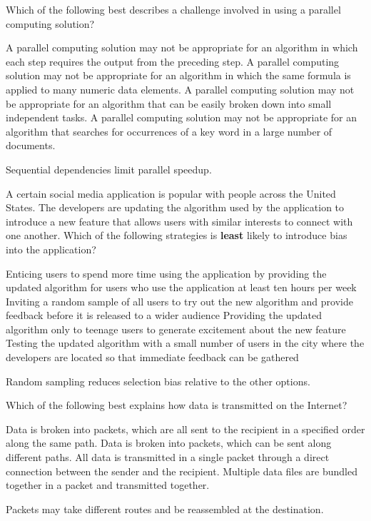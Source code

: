 \newpage




\question[5]
Which of the following best describes a challenge involved in using a parallel computing solution?
\begin{choices}
  \CorrectChoice A parallel computing solution may not be appropriate for an algorithm in which each step requires the output from the preceding step.
  \choice A parallel computing solution may not be appropriate for an algorithm in which the same formula is applied to many numeric data elements.
  \choice A parallel computing solution may not be appropriate for an algorithm that can be easily broken down into small independent tasks.
  \choice A parallel computing solution may not be appropriate for an algorithm that searches for occurrences of a key word in a large number of documents.
\end{choices}
\begin{solution}
  Sequential dependencies limit parallel speedup.
\end{solution}

\question[5]
A certain social media application is popular with people across the United States. The developers are updating the algorithm used by the application to introduce a new feature that allows users with similar interests to connect with one another. Which of the following strategies is \textbf{least} likely to introduce bias into the application?
\begin{choices}
  \choice Enticing users to spend more time using the application by providing the updated algorithm for users who use the application at least ten hours per week
  \CorrectChoice Inviting a random sample of all users to try out the new algorithm and provide feedback before it is released to a wider audience
  \choice Providing the updated algorithm only to teenage users to generate excitement about the new feature
  \choice Testing the updated algorithm with a small number of users in the city where the developers are located so that immediate feedback can be gathered
\end{choices}
\begin{solution}
  Random sampling reduces selection bias relative to the other options.
\end{solution}




\question[5]
Which of the following best explains how data is transmitted on the Internet?
\begin{choices}
  \choice Data is broken into packets, which are all sent to the recipient in a specified order along the same path.
  \CorrectChoice Data is broken into packets, which can be sent along different paths.
  \choice All data is transmitted in a single packet through a direct connection between the sender and the recipient.
  \choice Multiple data files are bundled together in a packet and transmitted together.
\end{choices}
\begin{solution}
  Packets may take different routes and be reassembled at the destination.
\end{solution}



